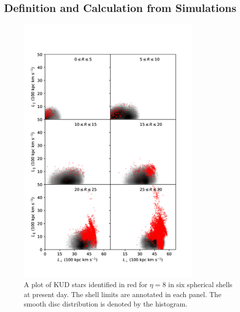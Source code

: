 



\subsection{Definition and Calculation from Simulations} \label{ssec:def}

\begin{figure}
    \centering
	\includegraphics[width=0.8\textwidth]{../figures/angmom_268824_eta_8.pdf}
	\caption{A plot of KUD stars identified in red for $\eta=8$ in six spherical shells at present day. The shell limits are annotated in each panel. The smooth disc distribution is denoted by the histogram.}
	\label{fig:angmom_eta}
\end{figure}




